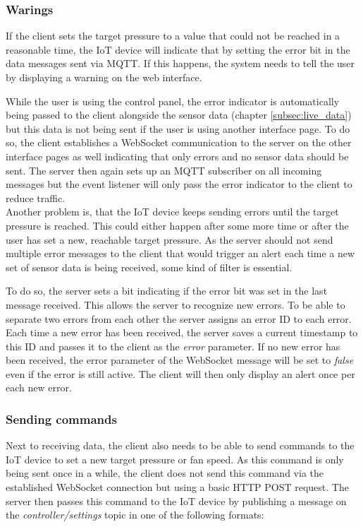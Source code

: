 \subsubsection{Warings}
\label{subsec:warnings}

If the client sets the target pressure to a value that could not be reached in a reasonable time, the IoT device will indicate that by setting the error bit in the data messages sent via MQTT. If this happens, the system needs to tell the user by displaying a warning on the web interface.

While the user is using the control panel, the error indicator is automatically being passed to the client alongside the sensor data (chapter \ref{subsec:live_data}) but this data is not being sent if the user is using another interface page. To do so, the client establishes a WebSocket communication to the server on the other interface pages as well indicating that only errors and no sensor data should be sent. The server then again sets up an MQTT subscriber on all incoming messages but the event listener will only pass the error indicator to the client to reduce traffic.\\

Another problem is, that the IoT device keeps sending errors until the target pressure is reached. This could either happen after some more time or after the user has set a new, reachable target pressure. As the server should not send multiple error messages to the client that would trigger an alert each time a new set of sensor data is being received, some kind of filter is essential.

To do so, the server sets a bit indicating if the error bit was set in the last message received. This allows the server to recognize new errors. To be able to separate two errors from each other the server assigns an error ID to each error. Each time a new error has been received, the server saves a current timestamp to this ID and passes it to the client as the \textit{error} parameter. If no new error has been received, the error parameter of the WebSocket message will be set to \textit{false} even if the error is still active. The client will then only display an alert once per each new error.


\subsubsection{Sending commands}
\label{subsec:sending_commands}

Next to receiving data, the client also needs to be able to send commands to the IoT device to set a new target pressure or fan speed. As this command is only being sent once in a while, the client does not send this command via the established WebSocket connection but using a basic HTTP POST request. The server then passes this command to the IoT device by publishing a message on the \textit{controller/settings} topic in one of the following formats:

